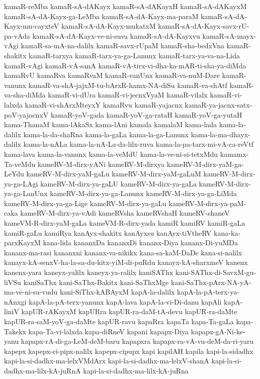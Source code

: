{kamaR-reMba
kamaR-sA-dAKayx
kamaR-sA-dAKayxH
kamaR-sA-dAKayxM
kamaR-sA-dA-Kayx-ga-LeMba
kamaR-sA-dA-Kayx-ma-paraM
kamaR-sA-dA-Kayx-mu-cayxteV
kamaR-sA-dA-Kayx-mukatxM
kamaR-sA-dA-Kayx-savx-rU-pa-vAda
kamaR-sA-dA-Kayx-ve-ni-suva
kamaR-sA-dA-Kayxvu
kamaR-sA-mayx-vAgi
kamaR-sa-mA-na-dalilx
kamaR-savx-rUpaM
kamaR-sha-bedxVna
kamaR-shakitx
kamaR-tarxya
kamaR-tarx-ya-ga-Lanunx
kamaR-tarx-ya-va-na-Lida
kamaR-vAgi
kamaR-vA-sanA
kamaR-vA-tirx-vi-dha-ka-mAR-ti-sha-ya-diMda
kamaRvU
kamaRva
kamaRvaM
kamaR-vanUnx
kamaR-va-nuM-Dare
kamaR-vanunx
kamaR-va-shA-jajxM-tu-bArxR-hamx-NA-diSu
kamaR-va-shAtf
kamaR-va-sha-diMda
kamaR-vi-dUra
kamaR-vi-jecnxVyaM
kamaR-vilalx
kamaR-vi-lalxda
kamaR-vi-shArxMteyxY
kamaRvu
kamaR-yajacnx
kamaR-ya-jacnx-satx-poV-yajocnxV
kamaR-yoV-gada
kamaR-yoV-ga-rataH
kamaR-yoV-ga-yutaH
kama-ThanaM
kama-lAkaSx
kama-lAni
kamala
kamalaM
kama-lada
kama-la-dalilx
kama-la-da-shaRna
kama-la-gaLa
kama-la-ga-Lanunx
kama-la-ma-dhayx-dalilx
kama-la-nALa
kama-la-nA-La-da-lilx-ruva
kama-la-pa-tarx-mi-vA-ca-reVtf
kama-lava
kama-la-vanunx
kama-la-veMdU
kama-la-ve-ni-si-tetxMdu
kamamx-Ta-veMdu
kameRV-M-dirx-yANi
kameRV-M-dirxya
kameRV-M-dirx-yaM-ga-LeYdu
kameRV-M-dirx-yaM-gaLu
kameRV-M-dirx-yaM-gaLuM
kameRV-M-dirx-ya-ga-LAgi
kameRV-M-dirx-ya-gaLU
kameRV-M-dirx-ya-gaLa
kameRV-M-dirx-ya-ga-LanUnx
kameRV-M-dirx-ya-ga-Lanunx
kameRV-M-dirx-ya-ga-LiMda
kameRV-M-dirx-ya-ga-Lige
kameRV-M-dirx-ya-gaLu
kameRV-M-dirx-ya-paM-caka
kameRV-M-dirx-ya-vAdi
kameRVsha
kameRVshaH
kameRV-shaneV
kameVM-R-dirx-yaM-gaLa
kameVM-R-dirx-yada
kamiR
kamiRV
kamiR-gaLa
kamiR-gaLu
kamiRya
kanAyx-shakitx
kanAyxsu
kanAyx-tiVtheRV
kana-ka-parxKayxM
kana-lida
kananxDa
kananxDi
kananx-Diya
kananx-Di-yuMDa
kananx-ma-rasi
kananxni
kananx-va-nikikx
kana-sa-kaM-DaDe
kana-si-nalilx
kanayx-kA-senxV-ha-la-sa-du-kitx-yiM-di-puRdu
kanayx-kA-sharxmeV
kanenx
kanenx-yara
kaneyx-yalilx
kaneyx-ya-ralilx
kaniSAThx
kani-SAThx-di-SavxM-gu-liVSu
kaniSaThx
kani-SaThx-Bakitx
kani-SaThxMge
kani-SaThx-pArx-NA-yA-ma-ve-ni-su-vudu
kani-SiThx-kABAyxM
kapA-la-dalilx
kapA-la-pA-terx-ya-nAnxgi
kapA-la-pA-terx-yanunx
kapA-lava
kapA-la-vi-Di-danu
kapAli
kapA-liniV
kapUR-rAKayxM
kapURra
kapUR-ra-daM-tA-devu
kapUR-ra-daMte
kapUR-ra-saM-yoV-ga-daMte
kapUR-ravu
kapaRra
kapaTa
kapa-Ta-gaLa
kapa-Takekx
kapa-Ta-vi-lalxda
kapa-diRneV
kapani
kapapx-Diya
kapapx-gA-Ni-ke-yanu
kapapx-rA-di-ga-LeM-deM-baru
kapapxra
kapapx-ra-vA-vu-deM-da-ri-yaru
kapepx
kapepx-ci-pipx-nalilx
kapepx-cipupx
kapi
kapilAH
kapila
kapi-la-sidadhx
kapi-la-si-dadhx-ma-lelxVMdArx
kapi-la-si-dadhx-ma-lelxV-shanA
kapi-la-si-dadhx-ma-lilx-kA-juRnA
kapi-la-si-dadhx-ma-lilx-kA-juRna
}
